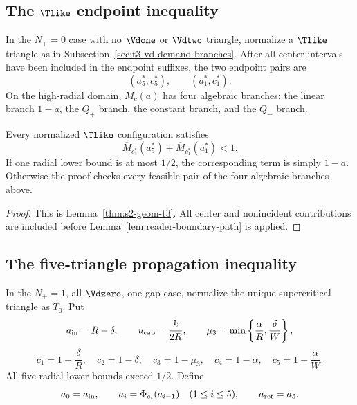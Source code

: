 \subsection{The $\Tlike$ endpoint inequality}

\begin{definition}
\label{def:body-t3-endpoint-state}
In the $N_+=0$ case with no $\Vdone$ or $\Vdtwo$ triangle, normalize a
$\Tlike$ triangle as in Subsection~\ref{sec:t3-vd-demand-branches}.  After all
center intervals have been included in the endpoint suffixes, the two endpoint
pairs are
\[
 (a_5^\ast,c_5^\ast),
 \qquad
 (a_1^\ast,c_1^\ast).
\]
On the high-radial domain, $M_c(a)$ has four algebraic branches: the linear
branch $1-a$, the $Q_+$ branch, the constant branch, and the $Q_-$ branch.
\end{definition}

\begin{proposition}
\label{prop:body-t3-endpoint}
Every normalized $\Tlike$ configuration satisfies
\[
 \overline M_{c_5^\ast}(a_5^\ast)+
 \overline M_{c_1^\ast}(a_1^\ast)<1.
\]
If one radial lower bound is at most $1/2$, the corresponding term is simply
$1-a$.  Otherwise the proof checks every feasible pair of the four algebraic
branches above.
\end{proposition}

\begin{proof}
This is Lemma~\ref{thm:s2-geom-t3}.  All center and
nonincident contributions are included before
Lemma~\ref{lem:reader-boundary-path} is applied.
\end{proof}

\subsection{The five-triangle propagation inequality}

\begin{definition}
\label{def:body-five-V-triangle-data}
In the $N_+=1$, all-$\Vdzero$, one-gap case, normalize the unique
supercritical triangle as $T_0$.  Put
\[
 a_{\rm in}=R-\delta,
 \qquad
 u_{\rm cap}=\frac{k}{2R},
 \qquad
 \mu_3=\min\left\{\frac{\alpha}{R},\frac{\delta}{W}\right\},
\]
\[
 c_1=1-\frac{\delta}{R},
 \quad
 c_2=1-\delta,
 \quad
 c_3=1-\mu_3,
 \quad
 c_4=1-\alpha,
 \quad
 c_5=1-\frac{\alpha}{W}.
\]
All five radial lower bounds exceed $1/2$.  Define
\[
 a_0=a_{\rm in},
 \qquad
 a_i=\Phi_{c_i}(a_{i-1})\quad(1\le i\le5),
 \qquad
 a_{\rm ret}=a_5.
\]
\end{definition}

